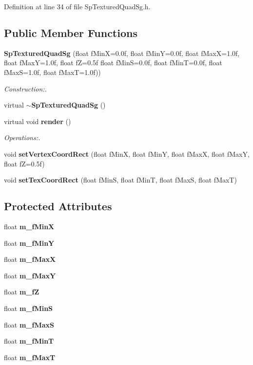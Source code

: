 Definition at line 34 of file Sp\-Textured\-Quad\-Sg.h.\subsection*{Public Member Functions}
\begin{CompactItemize}
\item 
{\bf Sp\-Textured\-Quad\-Sg} (float f\-Min\-X=0.0f, float f\-Min\-Y=0.0f, float f\-Max\-X=1.0f, float f\-Max\-Y=1.0f, float f\-Z=0.5f float f\-Min\-S=0.0f, float f\-Min\-T=0.0f, float f\-Max\-S=1.0f, float f\-Max\-T=1.0f))
\begin{CompactList}\small\item\em Construction:. \item\end{CompactList}\item 
virtual {\bf $\sim$Sp\-Textured\-Quad\-Sg} ()
\item 
virtual void {\bf render} ()
\begin{CompactList}\small\item\em Operations:. \item\end{CompactList}\item 
void {\bf set\-Vertex\-Coord\-Rect} (float f\-Min\-X, float f\-Min\-Y, float f\-Max\-X, float f\-Max\-Y, float f\-Z=0.5f)
\item 
void {\bf set\-Tex\-Coord\-Rect} (float f\-Min\-S, float f\-Min\-T, float f\-Max\-S, float f\-Max\-T)
\end{CompactItemize}
\subsection*{Protected Attributes}
\begin{CompactItemize}
\item 
float {\bf m\_\-f\-Min\-X}
\item 
float {\bf m\_\-f\-Min\-Y}
\item 
float {\bf m\_\-f\-Max\-X}
\item 
float {\bf m\_\-f\-Max\-Y}
\item 
float {\bf m\_\-f\-Z}
\item 
float {\bf m\_\-f\-Min\-S}
\item 
float {\bf m\_\-f\-Max\-S}
\item 
float {\bf m\_\-f\-Min\-T}
\item 
float {\bf m\_\-f\-Max\-T}
\end{CompactItemize}


